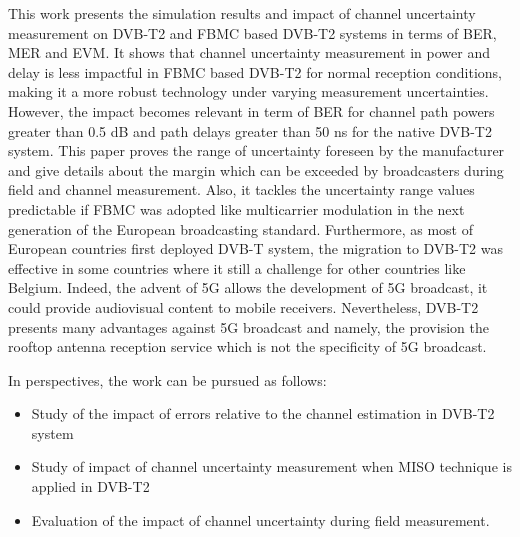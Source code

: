 \documentclass[10pt]{article}
\begin{document}
This work presents the simulation results and impact of channel uncertainty measurement on DVB-T2 and FBMC based DVB-T2 systems in terms of BER, MER and EVM. It shows that channel uncertainty measurement in power and delay is less impactful in FBMC based DVB-T2 for normal reception conditions, making it a more robust technology under varying measurement uncertainties.
However, the impact becomes relevant in term of BER for channel path powers greater than 0.5 dB and path delays greater than 50 ns for the native DVB-T2 system. This paper proves the range of uncertainty foreseen by the manufacturer and give details about the margin which can be exceeded by broadcasters during field and channel measurement. Also, it tackles the uncertainty range values predictable if FBMC was adopted like multicarrier modulation in the next generation of the European broadcasting standard. Furthermore, as most of European countries first deployed DVB-T system, the migration to DVB-T2 was effective in some countries where it still a challenge for other countries like Belgium. Indeed, the advent of 5G allows the development of 5G broadcast, it could provide audiovisual content to mobile receivers. Nevertheless, DVB-T2 presents many advantages against 5G broadcast and namely, the provision the rooftop antenna reception service which is not the specificity of 5G broadcast.

In perspectives, the work can be pursued as follows:

\begin{itemize}[label=-]
    \item Study of the impact of errors relative to the channel estimation in DVB-T2 system
    \item Study of impact of channel uncertainty measurement when MISO technique is applied in DVB-T2
    \item Evaluation of the impact of channel uncertainty during field measurement.
\end{itemize}
\end{document}
